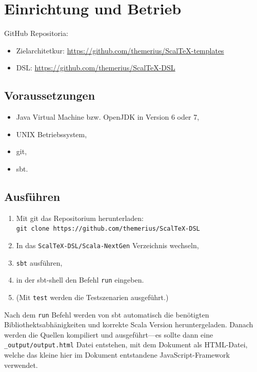 \chapter{Einrichtung und Betrieb}

GitHub Repositoria:

\begin{itemize}
  \item Zielarchitetkur: \url{https://github.com/themerius/ScalTeX-templates}
  \item DSL: \url{https://github.com/themerius/ScalTeX-DSL}
\end{itemize}

\section{Voraussetzungen}

\begin{itemize}
  \item Java Virtual Machine bzw. OpenJDK in Version 6 oder 7,
  \item UNIX Betriebssystem,
  \item git,
  \item sbt.
\end{itemize}

\section{Ausführen}

\begin{enumerate}
  \item Mit git das Repositorium herunterladen:\\
        \verb+git clone https://github.com/themerius/ScalTeX-DSL+
  \item In das \verb+ScalTeX-DSL/Scala-NextGen+ Verzeichnis wechseln,
  \item \verb+sbt+ ausführen,
  \item in der sbt-shell den Befehl \verb+run+ eingeben.
  \item (Mit \verb+test+ werden die Testszenarien ausgeführt.)
\end{enumerate}

Nach dem \verb+run+ Befehl werden von sbt automatisch die benötigten
Bibliothektsabhänigkeiten und korrekte Scala Version heruntergeladen.
Danach werden die Quellen kompiliert und ausgeführt---es sollte dann eine
\verb+_output/output.html+ Datei entstehen, mit dem Dokument als HTML-Datei,
welche das kleine hier im Dokument entstandene JavaScript-Framework verwendet.

